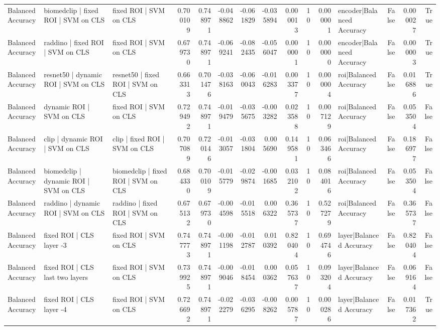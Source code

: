 \begin{table}
\begin{tabular}{lllrrrrrrrrlrrr}
Balanced Accuracy & biomedclip | fixed ROI | SVM on CLS & fixed ROI | SVM on CLS & 0.700109 & 0.748971 & -0.048862 & -0.061829 & -0.035894 & 0.000013 & 10 & 0.000001 & encoder|Balanced Accuracy & False & 0.000027 & True \\
Balanced Accuracy & raddino | fixed ROI | SVM on CLS & fixed ROI | SVM on CLS & 0.679730 & 0.748971 & -0.069241 & -0.082435 & -0.056047 & 0.000001 & 10 & 0.000000 & encoder|Balanced Accuracy & False & 0.000003 & True \\
Balanced Accuracy & resnet50 | dynamic ROI | SVM on CLS & resnet50 | fixed ROI | SVM on CLS & 0.663313 & 0.701476 & -0.038163 & -0.060043 & -0.016283 & 0.003377 & 10 & 0.000004 & roi|Balanced Accuracy & False & 0.016886 & True \\
Balanced Accuracy & dynamic ROI | SVM on CLS & fixed ROI | SVM on CLS & 0.729492 & 0.748971 & -0.019479 & -0.035675 & -0.003282 & 0.023588 & 10 & 0.007129 & roi|Balanced Accuracy & False & 0.053504 & False \\
Balanced Accuracy & clip | dynamic ROI | SVM on CLS & clip | fixed ROI | SVM on CLS & 0.707089 & 0.720146 & -0.013057 & -0.031804 & 0.005690 & 0.149581 & 10 & 0.063466 & roi|Balanced Accuracy & False & 0.186977 & False \\
Balanced Accuracy & biomedclip | dynamic ROI | SVM on CLS & biomedclip | fixed ROI | SVM on CLS & 0.684330 & 0.700109 & -0.015779 & -0.029874 & -0.001685 & 0.032102 & 10 & 0.084016 & roi|Balanced Accuracy & False & 0.053504 & False \\
Balanced Accuracy & raddino | dynamic ROI | SVM on CLS & raddino | fixed ROI | SVM on CLS & 0.675132 & 0.679730 & -0.004598 & -0.015518 & 0.006322 & 0.365737 & 10 & 0.527279 & roi|Balanced Accuracy & False & 0.365737 & False \\
Balanced Accuracy & fixed ROI | CLS layer -3 & fixed ROI | SVM on CLS & 0.747773 & 0.748971 & -0.001198 & -0.012787 & 0.010392 & 0.820404 & 10 & 0.694746 & layer|Balanced Accuracy & False & 0.820404 & False \\
Balanced Accuracy & fixed ROI | CLS last two layers & fixed ROI | SVM on CLS & 0.739925 & 0.748971 & -0.009046 & -0.018454 & 0.000362 & 0.057637 & 10 & 0.093204 & layer|Balanced Accuracy & False & 0.069164 & False \\
Balanced Accuracy & fixed ROI | CLS layer -4 & fixed ROI | SVM on CLS & 0.726692 & 0.748971 & -0.022279 & -0.036295 & -0.008262 & 0.005787 & 10 & 0.000286 & layer|Balanced Accuracy & False & 0.017362 & True \\

\end{tabular}
\end{table}

